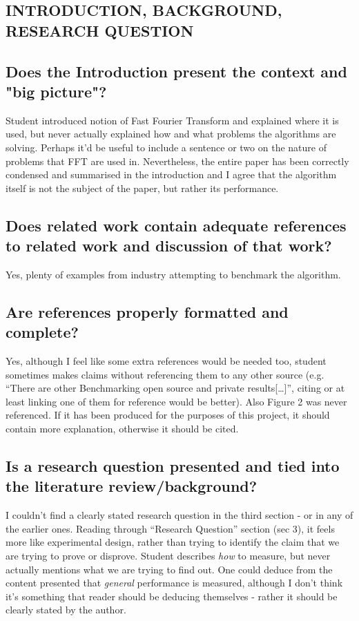 \documentclass{article}
\begin{document}
    \begin{normalsize}
    
    	\section{INTRODUCTION, BACKGROUND, RESEARCH QUESTION}
       \subsection{Does the Introduction present the context and "big picture"?} 
Student introduced notion of Fast Fourier Transform and explained where it is used, but never actually explained how and what problems the algorithms are solving. Perhaps it'd be useful to include a sentence or two on the nature of problems that FFT are used in. Nevertheless, the entire paper has been correctly condensed and summarised in the introduction and I agree that the algorithm itself is not the subject of the paper, but rather its performance.
      
		\subsection{Does related work contain adequate references to related work and discussion of that work?  }
Yes, plenty of examples from industry attempting to benchmark the algorithm.
\subsection{Are references properly formatted and complete?}
Yes, although I feel like some extra references would be needed too, student sometimes makes claims without referencing them to any other source (e.g. ``There are other Benchmarking open source and private results[\ldots]'', citing or at least linking one of them for reference would be better).
\bigbreak\noindent
Also Figure 2 was never referenced. If it has been produced for the purposes of this project, it should contain more explanation, otherwise it should be cited. 
\subsection{Is a research question presented and tied into the literature review/background?}
I couldn't find a clearly stated research question in the third section - or in any of the earlier ones. Reading through ``Research Question'' section (sec 3), it feels more like experimental design, rather than trying to identify the claim that we are trying to prove or disprove. Student describes \textit{how} to measure, but never actually mentions what we are trying to find out. One could deduce from the content presented that \textit{general} performance is measured, although I don't think it's something that reader should be deducing themselves - rather it should be clearly stated by the author.

\end{normalsize}
\end{document}

